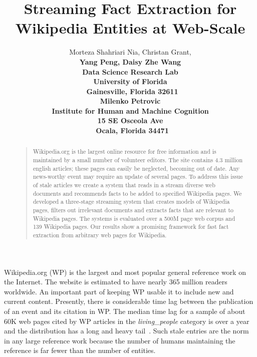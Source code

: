 \documentclass[letterpaper]{article}
\begin{document}
%
\title{Streaming Fact Extraction for Wikipedia Entities at Web-Scale}
\author{Morteza Shahriari Nia, Christan Grant, \\
\bf \large Yang Peng, Daisy Zhe Wang\\
Data Science Research Lab\\
University of Florida\\\
Gainesville, Florida 32611\\
\And Milenko Petrovic\\
Institute for Human and Machine Cognition\\ 15 SE Osceola Ave \\\ Ocala, Florida 34471
}


\maketitle
\begin{abstract}
\begin{quote}
Wikipedia.org is the largest online resource for free information and is maintained by a small number of volunteer editors.
The site contains 4.3 million english articles; these pages can easily be neglected, becoming out of date.
Any news-worthy event may require an update of several pages.
To address this issue of stale articles we create a system that reads
in a stream diverse web documents and recommends
facts to be added to specified Wikipedia pages.
We developed a three-stage streaming system that creates models of Wikipedia pages,
filters out irrelevant documents and 
extracts facts that are relevant to Wikipedia pages.
The systems is evaluated over a 500M page web corpus and 139 Wikipedia pages.
Our results show a promising framework for fast fact extraction from arbitrary web pages for Wikipedia.

\end{quote}
\end{abstract}

\noindent 

Wikipedia.org (WP) is the largest and most popular general reference work on the Internet.
The website is estimated to have nearly 365 million readers worldwide.
An important part of keeping WP usable it to include new and current content.
Presently, there is considerable time lag between the publication of an event and its citation in WP\@.
The median time lag for a sample of about 60K web pages cited by WP articles in the \textit{living\_people} category is over a year and the distribution has a long and heavy tail~\cite{JFrank12}.
Such stale entries are the norm in any large reference work because the number
of humans maintaining the reference is far fewer than the number of entities.
\end{document}
